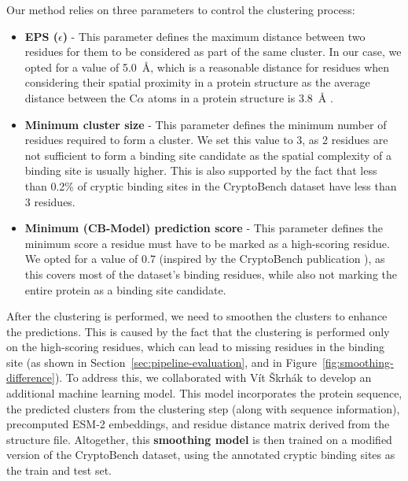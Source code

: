 Our method relies on three parameters to control the clustering process:
\begin{itemize}
    \item \textbf{EPS ($\epsilon$)} - This parameter defines the maximum distance between two residues for them to be considered as part of the same cluster. In our case, we opted for a value of 5.0~\AA, which is a reasonable distance for residues when considering their spatial proximity in a protein structure as the average distance between the C$\alpha$ atoms in a protein structure is 3.8~\AA{} \cite{creighton1993proteins}.
    \item \textbf{Minimum cluster size} - This parameter defines the minimum number of residues required to form a cluster. We set this value to 3, as 2 residues are not sufficient to form a binding site candidate as the spatial complexity of a binding site is usually higher. This is also supported by the fact that less than 0.2\% of cryptic binding sites in the CryptoBench dataset have less than 3 residues.
    \item \textbf{Minimum (CB-Model) prediction score} - This parameter defines the minimum score a residue must have to be marked as a high-scoring residue. We opted for a value of 0.7 (inspired by the CryptoBench publication \cite{vskrhak2025cryptobench}), as this covers most of the dataset's binding residues, while also not marking the entire protein as a binding site candidate.
\end{itemize}

After the clustering is performed, we need to smoothen the clusters to enhance the predictions. This is caused by the fact that the clustering is performed only on the high-scoring residues, which can lead to missing residues in the binding site (as shown in Section~\ref{sec:pipeline-evaluation}, and in Figure~\ref{fig:smoothing-difference}). To address this, we collaborated with Vít Škrhák to develop an additional machine learning model. This model incorporates the protein sequence, the predicted clusters from the clustering step (along with sequence information), precomputed ESM-2 embeddings, and residue distance matrix derived from the structure file. Altogether, this \textbf{smoothing model} is then trained on a modified version of the CryptoBench dataset, using the annotated cryptic binding sites as the train and test set.

